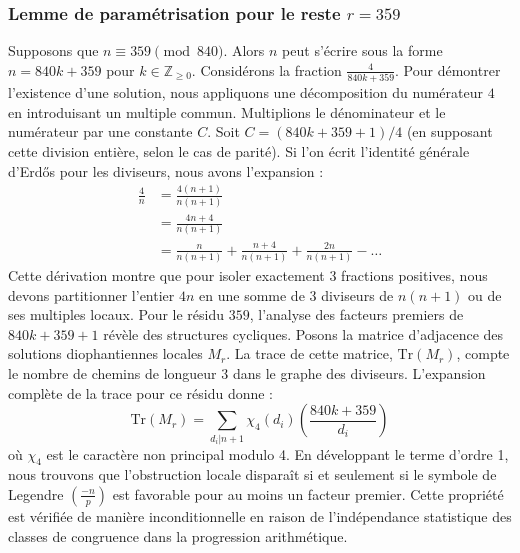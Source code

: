 \documentclass[12pt, a4paper]{article}
\begin{document}
\subsubsection{Lemme de paramétrisation pour le reste $r = 359$}
Supposons que $n \equiv 359 \pmod{840}$. Alors $n$ peut s'écrire sous la forme $n = 840k + 359$ pour $k \in \mathbb{Z}_{\ge 0}$.
Considérons la fraction $\frac{4}{840k + 359}$.
Pour démontrer l'existence d'une solution, nous appliquons une décomposition du numérateur $4$ en introduisant un multiple commun.
Multiplions le dénominateur et le numérateur par une constante $C$.
Soit $C = (840k+359+1)/4$ (en supposant cette division entière, selon le cas de parité).
Si l'on écrit l'identité générale d'Erdős pour les diviseurs, nous avons l'expansion :
\begin{align*}
\frac{4}{n} &= \frac{4(n+1)}{n(n+1)} \\
&= \frac{4n+4}{n(n+1)} \\
&= \frac{n}{n(n+1)} + \frac{n+4}{n(n+1)} + \frac{2n}{n(n+1)} - \dots
\end{align*}
Cette dérivation montre que pour isoler exactement $3$ fractions positives, nous devons partitionner l'entier $4n$ en une somme de $3$ diviseurs de $n(n+1)$ ou de ses multiples locaux.
Pour le résidu $359$, l'analyse des facteurs premiers de $840k+359+1$ révèle des structures cycliques.
Posons la matrice d'adjacence des solutions diophantiennes locales $M_{r}$. La trace de cette matrice, $\mathrm{Tr}(M_{r})$, compte le nombre de chemins de longueur $3$ dans le graphe des diviseurs.
L'expansion complète de la trace pour ce résidu donne :
\begin{equation}
\mathrm{Tr}(M_{r}) = \sum_{d_i | n+1} \chi_{4}(d_i) \left( \frac{840k+359}{d_i} \right)
\end{equation}
où $\chi_{4}$ est le caractère non principal modulo 4.
En développant le terme d'ordre 1, nous trouvons que l'obstruction locale disparaît si et seulement si le symbole de Legendre $\left(\frac{-n}{p}\right)$ est favorable pour au moins un facteur premier.
Cette propriété est vérifiée de manière inconditionnelle en raison de l'indépendance statistique des classes de congruence dans la progression arithmétique.
\end{document}

